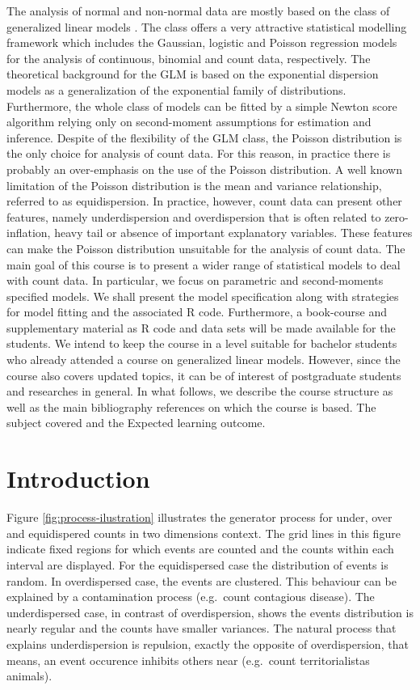 \documentclass[9pt,a5paper,]{book}
\begin{document}
The analysis of normal and non-normal data are mostly based on the class
of generalized linear models \citep{nelder1972}. The class offers a very
attractive statistical modelling framework which includes the Gaussian,
logistic and Poisson regression models for the analysis of continuous,
binomial and count data, respectively. The theoretical background for
the GLM is based on the exponential dispersion models
\citep{jorgensen1987, jorgensen1997} as a generalization of the
exponential family of distributions. Furthermore, the whole class of
models can be fitted by a simple Newton score algorithm relying only on
second-moment assumptions for estimation and inference. Despite of the
flexibility of the GLM class, the Poisson distribution is the only
choice for analysis of count data. For this reason, in practice there is
probably an over-emphasis on the use of the Poisson distribution. A well
known limitation of the Poisson distribution is the mean and variance
relationship, referred to as equidispersion. In practice, however, count
data can present other features, namely underdispersion and
overdispersion that is often related to zero-inflation, heavy tail or
absence of important explanatory variables. These features can make the
Poisson distribution unsuitable for the analysis of count data. The main
goal of this course is to present a wider range of statistical models to
deal with count data. In particular, we focus on parametric and
second-moments specified models. We shall present the model
specification along with strategies for model fitting and the associated
R code. Furthermore, a book-course and supplementary material as R
\citep{rcore2016} code and data sets will be made available for the
students. We intend to keep the course in a level suitable for bachelor
students who already attended a course on generalized linear models.
However, since the course also covers updated topics, it can be of
interest of postgraduate students and researches in general. In what
follows, we describe the course structure as well as the main
bibliography references on which the course is based. The subject
covered and the Expected learning outcome.

\chapter{Introduction}\label{introduction}

Figure \ref{fig:process-ilustration} illustrates the generator process
for under, over and equidispered counts in two dimensions context. The
grid lines in this figure indicate fixed regions for which events are
counted and the counts within each interval are displayed. For the
equidispersed case the distribution of events is random. In
overdispersed case, the events are clustered. This behaviour can be
explained by a contamination process (e.g.~count contagious disease).
The underdispersed case, in contrast of overdispersion, shows the events
distribution is nearly regular and the counts have smaller variances.
The natural process that explains underdispersion is repulsion, exactly
the opposite of overdispersion, that means, an event occurence inhibits
others near (e.g.~count territorialistas animals).
\end{document}
